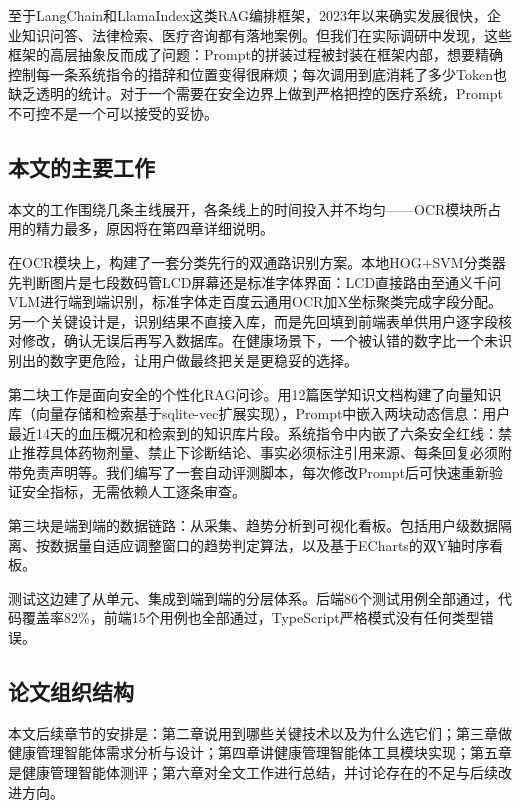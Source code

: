 \documentclass[zihao=-4,a4paper]{ctexart}
\numberwithin{figure}{section}
\numberwithin{table}{section}
\begin{document}
至于LangChain和LlamaIndex这类RAG编排框架，2023年以来确实发展很快，企业知识问答、法律检索、医疗咨询都有落地案例。但我们在实际调研中发现，这些框架的高层抽象反而成了问题：Prompt的拼装过程被封装在框架内部，想要精确控制每一条系统指令的措辞和位置变得很麻烦；每次调用到底消耗了多少Token也缺乏透明的统计。对于一个需要在安全边界上做到严格把控的医疗系统，Prompt不可控不是一个可以接受的妥协。

\subsection{本文的主要工作}

本文的工作围绕几条主线展开，各条线上的时间投入并不均匀——OCR模块所占用的精力最多，原因将在第四章详细说明。

在OCR模块上，构建了一套分类先行的双通路识别方案。本地HOG+SVM分类器先判断图片是七段数码管LCD屏幕还是标准字体界面：LCD直接路由至通义千问VLM进行端到端识别，标准字体走百度云通用OCR加X坐标聚类完成字段分配。另一个关键设计是，识别结果不直接入库，而是先回填到前端表单供用户逐字段核对修改，确认无误后再写入数据库。在健康场景下，一个被认错的数字比一个未识别出的数字更危险，让用户做最终把关是更稳妥的选择。

第二块工作是面向安全的个性化RAG问诊。用12篇医学知识文档构建了向量知识库（向量存储和检索基于sqlite-vec扩展实现），Prompt中嵌入两块动态信息：用户最近14天的血压概况和检索到的知识库片段。系统指令中内嵌了六条安全红线：禁止推荐具体药物剂量、禁止下诊断结论、事实必须标注引用来源、每条回复必须附带免责声明等。我们编写了一套自动评测脚本，每次修改Prompt后可快速重新验证安全指标，无需依赖人工逐条审查。

第三块是端到端的数据链路：从采集、趋势分析到可视化看板。包括用户级数据隔离、按数据量自适应调整窗口的趋势判定算法，以及基于ECharts的双Y轴时序看板。

测试这边建了从单元、集成到端到端的分层体系。后端86个测试用例全部通过，代码覆盖率82\%，前端15个用例也全部通过，TypeScript严格模式没有任何类型错误。

\subsection{论文组织结构}

本文后续章节的安排是：第二章说用到哪些关键技术以及为什么选它们；第三章做健康管理智能体需求分析与设计；第四章讲健康管理智能体工具模块实现；第五章是健康管理智能体测评；第六章对全文工作进行总结，并讨论存在的不足与后续改进方向。

\newpage
\end{document}
